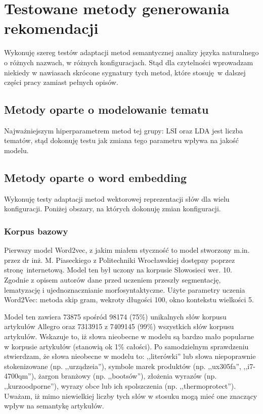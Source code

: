 \documentclass[pl]{minipw} %
\begin{document}
\section{Testowane metody generowania rekomendacji}

Wykonuję szereg testów adaptacji metod semantycznej analizy języka naturalnego o różnych nazwach, w różnych konfiguracjach. Stąd dla czytelności wprowadzam niekiedy w nawiasach skrócone sygnatury tych metod, które stosuję w dalszej części pracy zamiast pełnych opisów.

\subsection{Metody oparte o modelowanie tematu}

Najważniejszym hiperparametrem metod tej grupy: LSI oraz LDA jest liczba tematów, stąd dokonuję testu jak zmiana tego parametru wpływa na jakość modelu.

\subsection{Metody oparte o word embedding}
Wykonuję testy adaptacji metod wektorowej reprezentacji słów dla wielu konfiguracji. Poniżej obszary, na których dokonuję zmian konfiguracji.

\subsubsection{Korpus bazowy}

Pierwszy model Word2vec, z jakim miałem styczność to model\cite{pias} stworzony m.in. przez dr inż. M. Piaseckiego z Politechniki Wrocławskiej dostępny poprzez stronę internetową. Model ten był uczony na korpusie Słowosieci wer. 10\cite{wordnet}. Zgodnie z opisem autorów dane przed uczeniem  przeszły segmentację, lematyzację i ujednoznacznianie morfosyntaktyczne. Użyte parametry uczenia Word2Vec: metoda skip gram, wekroty długości 100, okno kontekstu wielkości 5.

Model ten zawiera 73875 spośród 98174 (75\%) unikalnych słów korpusu artykułów Allegro oraz 7313915 z 7409145 (99\%) wszystkich słów korpusu artykułów. Wskazuje to, iż słowa nieobecne w modelu są bardzo mało popularne w korpusie artykułów (stanowią ok 1\% całości). Po samodzielnym sprawdzeniu stwierdzam, że słowa nieobecne w modelu to: ,,literówki'' lub słowa niepoprawnie stokenizowane (np. ,,urządzeia''), symbole marek produktów (np. ,,ux305fa'', ,,i7-4700qm''), żargon branżowy (np. ,,bootsów''), złożenia wyrazów (np. ,,kurzoodporne''), wyrazy obce lub ich spolszczenia (np. ,,thermoprotect''). Uważam, iż mimo niewielkiej liczby tych słów w stosuku mogą mieć one znaczący wpływ na semantykę artykułów.
\end{document}
